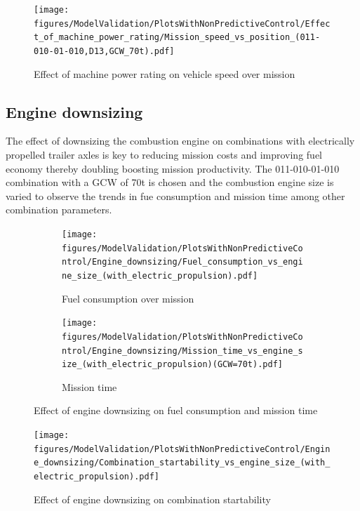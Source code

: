 \documentclass[ExampleMasters.tex]{subfiles}
\begin{document}

\begin{figure}[h!]
\centering
\texttt{[image: figures/ModelValidation/PlotsWithNonPredictiveControl/Effect\_of\_machine\_power\_rating/Mission\_speed\_vs\_position\_(011-010-01-010,D13,GCW\_70t).pdf]}
\caption{Effect of machine power rating on vehicle speed over mission}
\label{speedMissionMachineRating}
\end{figure}


\subsection{Engine downsizing}

The effect of downsizing the combustion engine on combinations with electrically propelled trailer axles is key to reducing mission costs and improving fuel economy thereby doubling boosting mission productivity. The 011-010-01-010 combination with a GCW of 70t is chosen and the combustion engine size is varied to observe the trends in fue consumption and mission time among other combination parameters.\\

\begin{figure}[h!]
\begin{subfigure}{.5\textwidth}
	\centering
	\texttt{[image: figures/ModelValidation/PlotsWithNonPredictiveControl/Engine\_downsizing/Fuel\_consumption\_vs\_engine\_size\_(with\_electric\_propulsion).pdf]}
	\caption{Fuel consumption over mission}
\end{subfigure}
\begin{subfigure}{.5\textwidth}
	\centering
	\texttt{[image: figures/ModelValidation/PlotsWithNonPredictiveControl/Engine\_downsizing/Mission\_time\_vs\_engine\_size\_(with\_electric\_propulsion)(GCW=70t).pdf]}
	\caption{Mission time}
\end{subfigure}
\caption{Effect of engine downsizing on fuel consumption and mission time}
\label{fuelTimeEngineDownsize}
\end{figure}

\begin{figure}[h!]
\centering
\texttt{[image: figures/ModelValidation/PlotsWithNonPredictiveControl/Engine\_downsizing/Combination\_startability\_vs\_engine\_size\_(with\_electric\_propulsion).pdf]}
\caption{Effect of engine downsizing on combination startability}
\label{startabilityEngineDownsize}
\end{figure}
\end{document}
